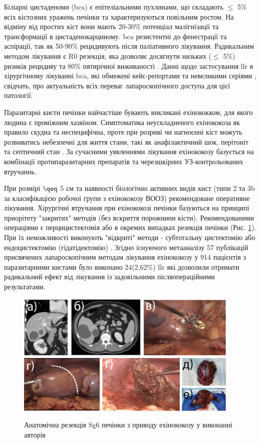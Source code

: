\begin{refsection}
Біліарні цистаденоми (\acrshort{bca}) є епітеліальними пухлинами, що складають $\leq$ 5\% всіх кістозних уражень печінки та характеризуються повільним ростом. На відміну від простих кіст вони  мають 20-30\% потенціал малігнізації та трансформації в цистаденокарциному. \acrshort{bca} резистентні до фенестрації та аспірації, так як 50-90\% рецидивують після паліативного лікування. Радикальним методом лікування є R0 резекція, яка дозволяє досягнути низьких ($\leq$ 5\%) ризиків рецидиву та 80\% пятирічної виживаності \cite{Soares2015}. Данні щодо застосування \acrshort{llr} в хірургічному лікуванні \acrshort{bca}, які обмежені кейс-репортами \cite{Machado2014, Li2016a} та невеликими серіями \cite{Koffron2004}, свідчать, про актуальність всіх переваг лапароскопічного доступа для цієї патології.

Паразитарні кисти печінки найчастіше бувають викликані ехінококком, для якого людина є проміжним хазяїном. Симптоматика неускладненого ехінококоза як правило скудна та неспецифічна, проте при розриві чи нагноєнні кіст можуть розвиватись небезпечні для життя стани, такі як анафілактичний шок, перітоніт та септичний стан \cite{Finazzi2015}. За сучасними уявленнями лікування ехінококозу базується на комбінації протипаразитарних препаратів та черезшкірних УЗ-контрольованих втручаннь. 

При розмірі $\qeq$ 5 см та наявності біологічно активних видів кист (типи 2 та 3b за класифікацією робочої групи з ехінококозу ВООЗ) рекомендоване оперативне лікування. Хірургічні втручання при ехінококозі печінки базуються на принципі приорітету "закритих" методів (без вскриття порожнини кісти). Рекомендованими операціями є перцицистектомія або в окремих випадках резекція печінки (Рис. \ref{fig:ECC-Sg6}). При їх неможливості виконують "відкриті" методи - субтотальну цистектомію або ендоцистектомію (гідатідектомію) \cite{Wen2019}. Згідно існуючого метааналізу 57 публікацій присвячених лапароскопічним методам лікування ехінококозу у 914 пацієнтів з паразитарними кистами було виконано 24(2,62\%) \acrshort{llr} які дозволили отримати радикальний ефект від лікування із задовільними післяопераційними результатами.  

 


\begin{figure}[h]
\caption{Анатомічна резекція Sg6 печінки з приводу ехінококозу у виконанні авторів}
\includegraphics[width=0.95\textwidth]{Illustrations/Chapter_01/ECC-Sg6.png}
\label{fig:ECC-Sg6}


\end{figure}
\end{refsection}
